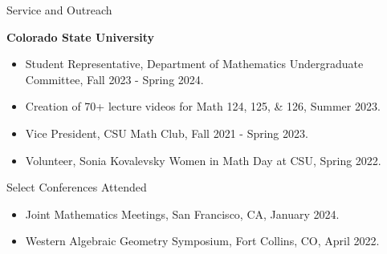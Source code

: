 \documentclass[
	11pt, %
]{resume} %
\begin{document}

\begin{rSection}{Service and Outreach}

	\textbf{Colorado State University}
	\begin{itemize}
		\item{Student Representative, Department of Mathematics Undergraduate Committee, Fall 2023 - Spring 2024.}
		\item{Creation of 70+ lecture videos for Math 124, 125, \& 126, Summer 2023.}
		\item{Vice President, CSU Math Club, Fall 2021 - Spring 2023.}
		\item{Volunteer, Sonia Kovalevsky Women in Math Day at CSU, Spring 2022.}
	\end{itemize}
	
\end{rSection}


\begin{rSection}{Select Conferences Attended}

	\begin{itemize}
		\item{Joint Mathematics Meetings, San Francisco, CA, January 2024.}
		\item{Western Algebraic Geometry Symposium, Fort Collins, CO, April 2022.}
	\end{itemize}
	
\end{rSection}





\fancyfoot{}
\end{document}
